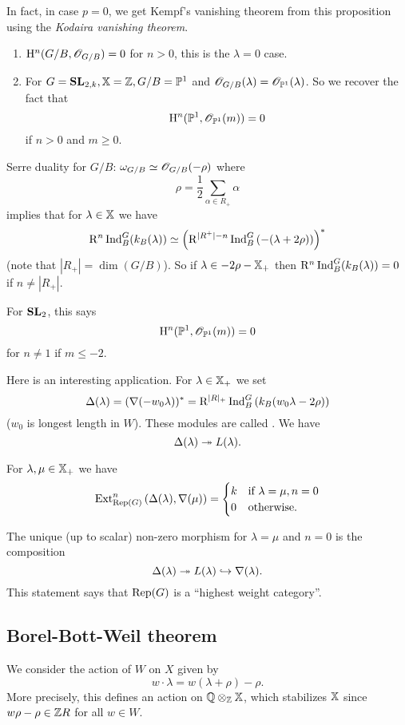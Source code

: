 	In fact, in case $p=0$, we get Kempf's vanishing theorem from this proposition using the
	\emph{Kodaira vanishing theorem}.
	\begin{example}\leavevmode
		\begin{enumerate}[(1)]
			\item $\mathrm{H}^{n}(G /B,\mathscr{O}_{G /B})=0$ for $n>0$, this is the $\lambda=0$ case.
			\item For $G=\mathbf{SL}_{2,k}, \mathbb{X}=\mathbb Z, G /B=\mathbb{P}^{1}$ and $\mathscr{O}_{G
				/B}(\lambda)=\mathscr{O}_{\mathbb{P}^{1}}(\lambda)$. So we recover the fact that
				\[
					\mathrm{H}^{n}(\mathbb{P}^{1},\mathscr{O}_{\mathbb{P}^{1}}(m)) = 0
				\]
				if $n>0$ and $m\ge 0$.
		\end{enumerate}
	\end{example}
	\begin{remark}
		Serre duality for $G /B$:  $\omega_{G /B}\simeq \mathscr{O}_{G /B}(-\rho)$ where
		\[
			\rho = \frac{1}{2}\sum_{\alpha\in R_+}\alpha
		\]
		implies that for $\lambda\in \mathbb{X}$ we have
		\[
			\mathrm{R}^{n}\operatorname{Ind}_{B}^{G}(k_B(\lambda)) \simeq \left( \mathrm{R}^{|R^{+}|-n}\operatorname{Ind}_B^{G}\left(
			-(\lambda+2\rho) \right)  \right) ^{*}
		\]
		(note that $|R_+| = \dim(G /B)$). So if $\lambda\in -2\rho-\mathbb{X}_+$ then
		$\mathrm{R}^{n}\operatorname{Ind}_B^{G}(k_B(\lambda))=0$ if $n\neq |R_+|$.

		For $\mathbf{SL}_2$, this says
		\[
			\mathrm{H}^{n}(\mathbb{P}^{1},\mathscr{O}_{\mathbb{P}^{1}}(m)) = 0
		\]
		for $n\neq 1$ if $m\le -2$.
	\end{remark}

	Here is an interesting application. For $\lambda\in \mathbb{X}_+$ we set
	\[
		\Delta(\lambda) = \left( \nabla (-w_0\lambda \right) )^{*} =
		\mathrm{R}^{|R|_+}\operatorname{Ind}_B^{G}\left( k_B(w_0\lambda-2\rho) \right)
	\]
	($w_0$ is longest length in $W$). These modules are called . We have
	\[
		\Delta(\lambda) \twoheadrightarrow L(\lambda).
	\]

	\begin{proposition}
		For $\lambda,\mu\in \mathbb{X}_+$ we have
		\[
			\operatorname{Ext}_{\operatorname{Rep}(G)}^{n}\left( \Delta(\lambda),\nabla(\mu) \right) =
			\begin{cases}
				k & \text{if }\lambda=\mu, n=0 \\
				0 & \text{otherwise}.
			\end{cases}
		\]
	\end{proposition}
	The unique (up to scalar) non-zero morphism for $\lambda=\mu$ and $n=0$ is the composition
	\[
		\Delta(\lambda) \twoheadrightarrow L(\lambda) \hookrightarrow \nabla(\lambda).
	\]
	This statement says that $\operatorname{Rep}(G)$ is a ``highest weight category''.

	\subsection{Borel-Bott-Weil theorem}
	We consider the action of $W$ on $X$ given by
	\[
		w\cdot \lambda = w(\lambda+\rho) - \rho.
	\]
	More precisely, this defines an action on $\mathbb Q\otimes_\mathbb Z\mathbb{X}$, which stabilizes $\mathbb{X}$
	since $w\rho-\rho\in \mathbb Z R$ for all $w\in W$.

